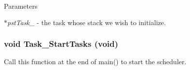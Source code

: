 \begin{DoxyParams}{Parameters}
\item[{\em $\ast$pstTask\_\-}]-\/ the task whose stack we wish to initialize. \end{DoxyParams}
\subsubsection[{Task\_\-StartTasks}]{\setlength{\rightskip}{0pt plus 5cm}void Task\_\-StartTasks (void)}\label{taskport_8h_a92f7efeeee257ca19025275ed9c1ad88}
Call this function at the end of main() to start the scheduler. 